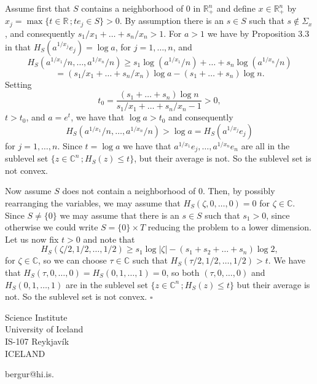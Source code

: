 \documentclass[a4paper,12pt,leqno,english]{article}
\numberwithin{equation}{section}
\newenvironment{proof}{\medbreak\noindent{\bf  Proof:}\rm}{\hfill$\square$\rm}
\begin{document}
\begin{proof}
Assume first that $S$ contains a neighborhood of $0$ in $\mathbb{R}^n_+$ and
    define $x \in \mathbb{R}^n_+$ by $x_j = \max\{t \in \mathbb{R} \,; te_j \in S\} > 0$.
By assumption there is an $s \in S$ such that $s \not \in \Sigma_x$, and consequently $s_1/x_1 + \dots + s_n/x_n > 1$.
For $a > 1$ we have by Proposition $3.3$ in \cite{MagSigSigSno:2023} that $H_S(a^{1/x_j}e_j) = \log a$, for $j = 1, \dots, n$, and
\begin{equation*}
    H_S(a^{1/x_1}/n, \dots, a^{1/x_n}/n)
    \geq
    s_1\log (a^{1/x_1}/n) + \dots + s_n\log (a^{1/x_n}/n)
\end{equation*}
\begin{equation*}
    =
    (s_1/x_1 + \dots + s_n/x_n) \log a - (s_1 + \dots + s_n) \log n.
\end{equation*}
Setting
\begin{equation*}
    t_0 = \frac{(s_1 + \dots + s_n)\log n}{s_1/x_1 + \dots + s_n/x_n - 1} > 0,
\end{equation*}
$t > t_0$, and $a = e^t$, we have that $\log a > t_0$ and consequently
\begin{equation*}
    H_S(a^{1/x_1}/n, \dots, a^{1/x_n}/n)
    >
    \log a
    =
    H_S(a^{1/x_j}e_j)
\end{equation*}
for $j = 1, \dots, n$.
Since $t = \log a$ we have that $a^{1/x_1}e_j, \dots, a^{1/x_n}e_n$ are all in the sublevel set $\{z \in \mathbb{C}^n \,; H_S(z) \leq t\}$,
    but their average is not.
So the sublevel set is not convex.

Now assume $S$ does not contain a neighborhood of $0$.
Then, by possibly rearranging the variables, we may assume that $H_S(\zeta, 0, \dots, 0) = 0$ for $\zeta \in \mathbb{C}$.
Since $S \neq \{0\}$ we may assume that there is an $s \in S$ such that $s_1 > 0$,
    since otherwise we could write $S = \{0\} \times T$ reducing the problem to a lower dimension.
Let us now fix $t > 0$ and note that
\begin{equation*}
    H_S(\zeta/2, 1/2, \dots, 1/2)
    \geq
    s_1\log |\zeta| - (s_1 + s_2 + \dots + s_n) \log 2,
\end{equation*}
    for $\zeta \in \mathbb{C}$, so we can choose $\tau \in \mathbb{C}$ such that $H_S(\tau/2, 1/2, \dots, 1/2) > t$.
We have that $H_S(\tau, 0, \dots, 0) = H_S(0, 1, \dots, 1) = 0$,
    so both $(\tau, 0, \dots, 0)$ and $H_S(0, 1, \dots, 1)$ are in the sublevel set $\{z \in \mathbb{C}^n \,; H_S(z) \leq t\}$ but their average is not.
So the sublevel set is not convex.
\end{proof}














{\small 





\smallskip\noindent
Science Institute\\
University of Iceland\\
IS-107 Reykjav\'ik\\
ICELAND 

\smallskip\noindent
bergur@hi.is.
}%
\end{document}
